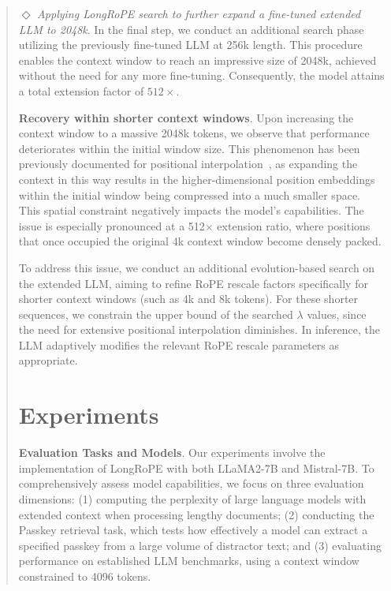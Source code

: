 \begin{abstract}
$\Diamond$ \textit{Applying LongRoPE search to further expand a fine-tuned extended LLM to 2048k}. In the final step, we conduct an additional search phase utilizing the previously fine-tuned LLM at 256k length. This procedure enables the context window to reach an impressive size of 2048k, achieved without the need for any more fine-tuning. Consequently, the model attains a total extension factor of $512\times$.

\textbf{Recovery within shorter context windows}. Upon increasing the context window to a massive 2048k tokens, we observe that performance deteriorates within the initial window size. This phenomenon has been previously documented for positional interpolation~\cite{pi}, as expanding the context in this way results in the higher-dimensional position embeddings within the initial window being compressed into a much smaller space. This spatial constraint negatively impacts the model's capabilities. The issue is especially pronounced at a 512$\times$ extension ratio, where positions that once occupied the original 4k context window become densely packed.

To address this issue, we conduct an additional evolution-based search on the extended LLM, aiming to refine RoPE rescale factors specifically for shorter context windows (such as 4k and 8k tokens). For these shorter sequences, we constrain the upper bound of the searched $\lambda$ values, since the need for extensive positional interpolation diminishes. In inference, the LLM adaptively modifies the relevant RoPE rescale parameters as appropriate.

 \section{Experiments}

\textbf{Evaluation Tasks and Models}. Our experiments involve the implementation of LongRoPE with both LLaMA2-7B and Mistral-7B. To comprehensively assess model capabilities, we focus on three evaluation dimensions: (1) computing the perplexity of large language models with extended context when processing lengthy documents; (2) conducting the Passkey retrieval task, which tests how effectively a model can extract a specified passkey from a large volume of distractor text; and (3) evaluating performance on established LLM benchmarks, using a context window constrained to 4096 tokens.


\end{abstract}
